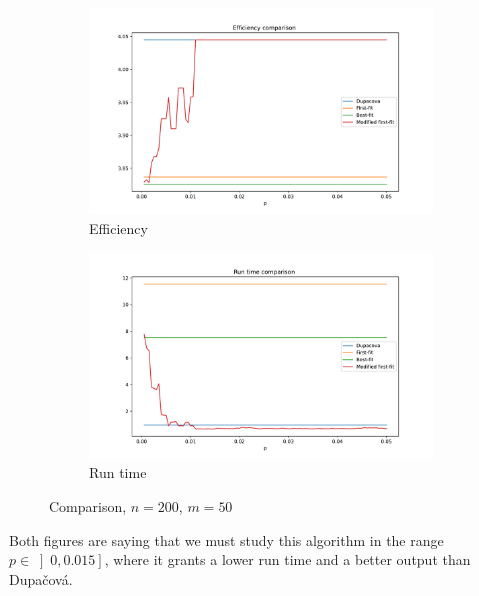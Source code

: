 \documentclass{amsart}
\begin{document}
\begin{figure}[ht]
    \centering
    \begin{subfigure}[b]{0.45\textwidth}
        \centering
        \includegraphics[width=1.1\textwidth]{plots/efficiency p.pdf}
        \caption{Efficiency}
    \end{subfigure}
    \hfill
    \begin{subfigure}[b]{0.45\textwidth}
        \centering
        \includegraphics[width=1.1\textwidth]{plots/run time p.pdf}
        \caption{Run time}
    \end{subfigure}
    \caption{Comparison, $n=200$, $m=50$}
    \label{p}
\end{figure}

Both figures are saying that we must study this algorithm in the range $p\in\left]0,0.015\right]$, where it grants a lower run time and a better output than Dupačová.
\end{document}
